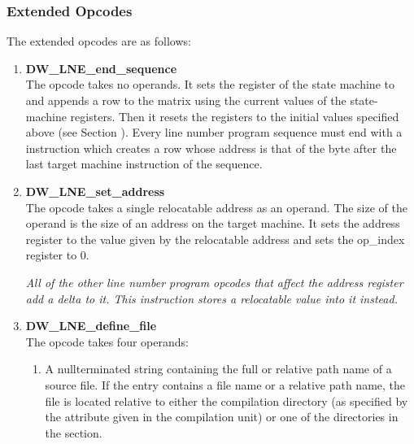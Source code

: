 \subsubsection{Extended Opcodes}
\label{chap:extendedopcodes}

The extended opcodes are as follows:

\begin{enumerate}[1. ]

\item \textbf{DW\_LNE\_end\_sequence} \\
The  opcode takes no operands. It sets the
register of the state machine to  and
appends a row to the matrix using the current values of the
state-machine registers. Then it resets the registers to the
initial values specified above 
(see Section ). 
Every line
number program sequence must end with a 
instruction which creates a row whose address is that of the
byte after the last target machine instruction of the sequence.

\item \textbf{DW\_LNE\_set\_address} \\
The  opcode takes a single relocatable
address as an operand. The size of the operand is the size
of an address on the target machine. It sets the address
register to the value given by the relocatable address and
sets the op\_index register to 0.

\textit{All of the other line number program opcodes that
affect the address register add a delta to it. This instruction
stores a relocatable value into it instead.}

\item \textbf{DW\_LNE\_define\_file} \\

The  opcode takes four operands:
\begin{enumerate}[1. ]

\item A null\dash terminated string containing the full or relative
path name of a source file. If the entry contains a file
name or a relative path name, the file is located relative
to either the compilation directory (as specified by the
 attribute given in the compilation unit)
or one of the directories in the 
 section.


\end{enumerate}
\end{enumerate}
